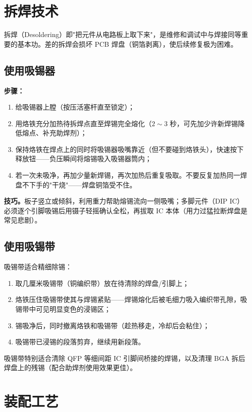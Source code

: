 \documentclass[12pt,UTF8]{ctexbook}
\begin{document}
\section{拆焊技术}
\label{sec:desoldering}

拆焊（Desoldering）即"把元件从电路板上取下来"，是维修和调试中与焊接同等重要的基本功。差的拆焊会损坏 PCB 焊盘（铜箔剥离），使后续修复极为困难。

\subsection{使用吸锡器}

\textbf{步骤：}
\begin{enumerate}
  \item 给吸锡器上膛（按压活塞杆直至锁定）；
  \item 用烙铁充分加热待拆焊点直至焊锡完全熔化（$2\sim3$ 秒，可先加少许新焊锡降低熔点、补充助焊剂）；
  \item 保持烙铁在焊点上的同时将吸锡器吸嘴靠近（但不要碰到烙铁头），快速按下释放钮——负压瞬间将熔锡吸入吸锡器筒内；
  \item 若一次未吸净，再加少量新焊锡，再次加热后重复吸取。不要反复加热同一焊盘不下手的"干烧"——焊盘铜箔受不住。
\end{enumerate}

\textbf{技巧。}板子竖立或倾斜，利用重力帮助熔锡流向一侧吸嘴；多脚元件（DIP IC）必须逐个引脚吸锡后用镊子轻摇确认全松，再拔取 IC 本体（用力过猛拉断焊盘是常见悲剧）。

\subsection{使用吸锡带}

吸锡带适合精细除锡：
\begin{enumerate}
  \item 取几厘米吸锡带（铜编织带）放在待清除的焊盘/引脚上；
  \item 烙铁压住吸锡带使其与焊锡紧贴——焊锡熔化后被毛细力吸入编织带孔隙，吸锡带中可见明显变色的浸锡区；
  \item 锡吸净后，同时撤离烙铁和吸锡带（趁热移走，冷却后会粘住）；
  \item 吸锡带已浸锡的段落剪弃，继续用新段落。
\end{enumerate}
吸锡带特别适合清除 QFP 等细间距 IC 引脚间桥接的焊锡，以及清理 BGA 拆后焊盘上的残锡（配合助焊剂使用效果更佳）。

\section{装配工艺}
\label{sec:assembly}
\end{document}
